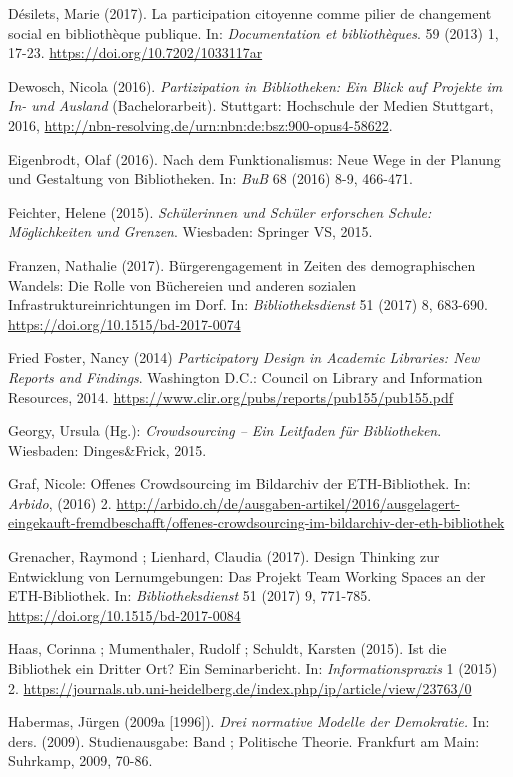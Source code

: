 \documentclass[a4paper,
fontsize=11pt,
oneside,
numbers=noperiodatend,
parskip=half-,
bibliography=totoc,
final
]{scrartcl}
\begin{document}
Désilets, Marie (2017). La participation citoyenne comme pilier de
changement social en bibliothèque publique. In: \emph{Documentation et
bibliothèques}. 59 (2013) 1, 17-23.
\href{http://dx.doi.org/10.7202/1033117ar}{https://doi.org/10.7202/1033117ar}

Dewosch, Nicola (2016). \emph{Partizipation in Bibliotheken: Ein Blick
auf Projekte im In- und Ausland} (Bachelorarbeit). Stuttgart: Hochschule
der Medien Stuttgart, 2016,
\url{http://nbn-resolving.de/urn:nbn:de:bsz:900-opus4-58622}.

Eigenbrodt, Olaf (2016). Nach dem Funktionalismus: Neue Wege in der
Planung und Gestaltung von Bibliotheken. In: \emph{BuB} 68 (2016) 8-9,
466-471.

Feichter, Helene (2015). \emph{Schülerinnen und Schüler erforschen
Schule: Möglichkeiten und Grenzen}. Wiesbaden: Springer VS, 2015.

Franzen, Nathalie (2017). Bürgerengagement in Zeiten des demographischen
Wandels: Die Rolle von Büchereien und anderen sozialen
Infrastruktureinrichtungen im Dorf. In: \emph{Bibliotheksdienst} 51
(2017) 8, 683-690. \url{https://doi.org/10.1515/bd-2017-0074}

Fried Foster, Nancy (2014) \emph{Participatory Design in Academic
Libraries: New Reports and Findings}. Washington D.C.: Council on
Library and Information Resources, 2014.
\url{https://www.clir.org/pubs/reports/pub155/pub155.pdf}

Georgy, Ursula (Hg.): \emph{Crowdsourcing -- Ein Leitfaden für
Bibliotheken}. Wiesbaden: Dinges\&Frick, 2015.

Graf, Nicole: Offenes Crowdsourcing im Bildarchiv der ETH-Bibliothek.
In: \emph{Arbido}, (2016) 2.
\url{http://arbido.ch/de/ausgaben-artikel/2016/ausgelagert-eingekauft-fremdbeschafft/offenes-crowdsourcing-im-bildarchiv-der-eth-bibliothek}

Grenacher, Raymond ; Lienhard, Claudia (2017). Design Thinking zur
Entwicklung von Lernumgebungen: Das Projekt Team Working Spaces an der
ETH-Bibliothek. In: \emph{Bibliotheksdienst} 51 (2017) 9, 771-785.
\url{https://doi.org/10.1515/bd-2017-0084}

Haas, Corinna ; Mumenthaler, Rudolf ; Schuldt, Karsten (2015). Ist die
Bibliothek ein Dritter Ort? Ein Seminarbericht. In:
\emph{Informationspraxis} 1 (2015) 2.
\url{https://journals.ub.uni-heidelberg.de/index.php/ip/article/view/23763/0}

Habermas, Jürgen (2009a {[}1996{]}). \emph{Drei normative Modelle der
Demokratie.} In: ders. (2009). Studienausgabe: Band ; Politische
Theorie. Frankfurt am Main: Suhrkamp, 2009, 70-86.
\end{document}
